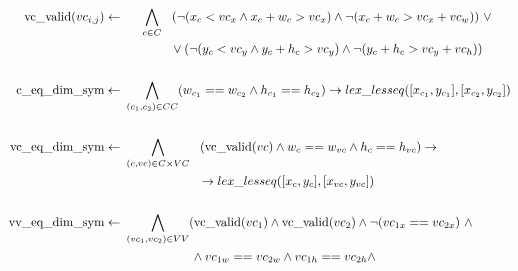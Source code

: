 \begin{align}
  \text{vc\_valid}(vc_{i,j})      \leftarrow & \ \hspace{0.45cm} \bigwedge_{c \in C} \hspace{0.3cm} (\neg(x_c < vc_x \land x_c + w_c > vc_x) \land \neg(x_c + w_c > vc_x + vc_w))\ \lor      \nonumber           \\
                                             & \ \hspace{1.3cm} \lor (\neg(y_c < vc_y \land y_c + h_c > vc_y) \land \neg(y_c + h_c > vc_y + vc_h))                                                               \\
                                             & \nonumber                                                                                                                                                         \\
  \text{c\_eq\_dim\_sym}          \leftarrow & \ \bigwedge_{(c_1, c_2) \in CC} (w_{c_1} == w_{c_2} \land h_{c_1} == h_{c_2}) \rightarrow lex\_lesseq([x_{c_1}, y_{c_1}], [x_{c_2}, y_{c_2}])                     \\
                                             & \nonumber                                                                                                                                                         \\
  \text{vc\_eq\_dim\_sym}         \leftarrow & \ \bigwedge_{(c, vc) \in C \times VC} \hspace{0.3cm} (\text{vc\_valid}(vc) \land w_{c} == w_{vc} \land h_{c} == h_{vc}) \rightarrow               \nonumber       \\
                                             & \hspace{2.2cm} \rightarrow lex\_lesseq([x_{c}, y_{c}], [x_{vc}, y_{vc}])                                                                                          \\
                                             & \nonumber                                                                                                                                                         \\
  \text{vv\_eq\_dim\_sym}         \leftarrow & \ \bigwedge_{(vc_1, vc_2) \in VV} (\text{vc\_valid}(vc_1) \land \text{vc\_valid}(vc_2) \land \neg (vc_{1x} == vc_{2x})\ \land                           \nonumber \\
                                             & \hspace{2cm} \land vc_{1w} == vc_{2w} \land vc_{1h} == vc_{2h} \land \nonumber                                                                                    \\

\end{align}
